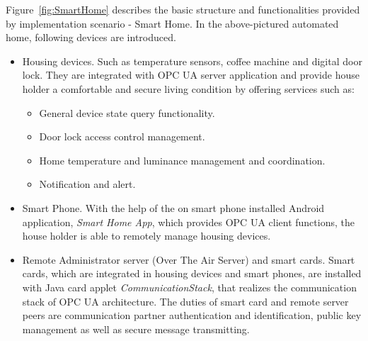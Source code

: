 Figure~\ref{fig:SmartHome} describes the basic structure and functionalities provided by implementation scenario  -  Smart Home. In the above-pictured automated home, following devices are introduced.
\begin{itemize}
\item Housing devices. Such as temperature sensors, coffee machine and digital door lock. They are integrated with OPC UA server application and provide house holder a comfortable and secure living condition by offering services such as:
\begin{itemize}
\item General device state query functionality.
\item Door lock access control management.
\item Home temperature and luminance management and coordination.
\item Notification and alert.
\end{itemize}
\item Smart Phone. With the help of the on smart phone installed  Android  application, \emph{Smart Home App}, which provides OPC UA client functions, the house holder is able to remotely manage housing devices.
\item Remote Administrator server  (Over The Air Server)  and smart cards. Smart cards, which are integrated in housing devices and smart phones, are installed with Java card applet \emph{CommunicationStack}, that realizes the communication stack of OPC UA architecture. The duties of smart card and remote server peers are  communication partner authentication and identification, public key management as well as  secure message transmitting.
\end{itemize}

